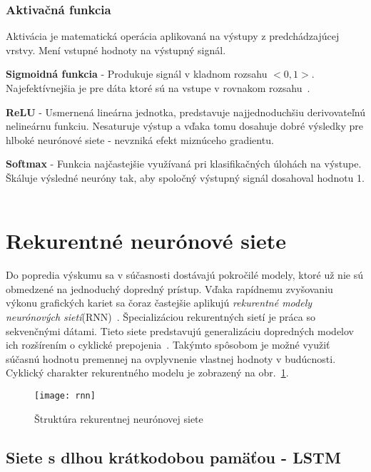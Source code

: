 \subsubsection*{Aktivačná funkcia}
\label{activation_function}
Aktivácia je matematická operácia aplikovaná na výstupy z predchádzajúcej vrstvy. Mení vstupné hodnoty na výstupný signál. 

\textbf{Sigmoidná funkcia} - Produkuje signál v kladnom rozsahu $<0,1>$. Najefektívnejšia je pre dáta ktoré sú na vstupe v rovnakom rozsahu~\cite{sibi2013analysis}.

\textbf{ReLU} - Usmernená lineárna jednotka, predstavuje najjednoduchšiu derivovateľnú nelineárnu funkciu. Nesaturuje výstup a vďaka tomu dosahuje dobré výsledky pre hlboké neurónové siete - nevzniká efekt miznúceho gradientu.
	
\textbf{Softmax} - Funkcia najčastejšie využívaná pri klasifikačných úlohách na výstupe. Škáluje výsledné neuróny tak, aby spoločný výstupný signál dosahoval hodnotu 1. ~\cite{toth2013phone}


\section{Rekurentné neurónové siete}
\label{analyza_pokrocile_modely_nn}

Do popredia výskumu sa v súčasnosti dostávajú pokročilé modely, ktoré už nie sú obmedzené na jednoduchý dopredný prístup. Vďaka rapídnemu zvyšovaniu výkonu grafických kariet sa čoraz častejšie aplikujú \textit{rekurentné modely neurónových sietí}(RNN)~\cite{jaeger2002tutorial}. Špecializáciou rekurentných sietí je práca so sekvenčnými dátami. Tieto siete predstavujú generalizáciu dopredných modelov ich rozšírením o cyklické prepojenia~\cite{Goodfellow-et-al-2016-Book}.
Takýmto spôsobom je možné využiť súčasnú hodnotu premennej na ovplyvnenie vlastnej hodnoty v budúcnosti. Cyklický charakter rekurentného modelu je zobrazený na obr.~\ref{fig:rnn}.

\begin{figure}[H]
\begin{center}\texttt{[image: rnn]}\end{center}
\caption[rnn]{Štruktúra rekurentnej neurónovej siete~\cite{jaeger2002tutorial}}\label{fig:rnn}
\end{figure}

\subsection{Siete s dlhou krátkodobou pamäťou - LSTM}


